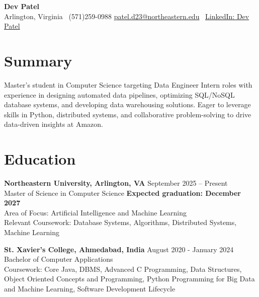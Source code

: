 \documentclass[a4paper,10pt]{article}
\begin{document}
\begin{center}
\vspace{-3mm}
    \fontsize{16}{18}\selectfont \textbf{Dev Patel} \\
    \vspace{0mm}
    \normalsize Arlington, Virginia \textbar\ (571)259-0988  \textbar       \href{mailto:patel.d23@northeastern.edu}{patel.d23@northeastern.edu} \textbar\ \href{https://www.linkedin.com/in/devxpatel//}{LinkedIn: Dev Patel} \\
\end{center}



\section*{Summary}
Master's student in Computer Science targeting Data Engineer Intern roles with experience in designing automated data pipelines, optimizing SQL/NoSQL database systems, and developing data warehousing solutions. Eager to leverage skills in Python, distributed systems, and collaborative problem-solving to drive data-driven insights at Amazon.
 
\vspace{ 0 mm}
\section*{Education}
\textbf{Northeastern University, Arlington, VA} \hfill September 2025 -- Present\\
Master of Science in Computer Science \hfill \textbf{Expected graduation: December 2027} \\
Area of Focus: Artificial Intelligence and Machine Learning\\
Relevant Coursework: Database Systems, Algorithms, Distributed Systems, Machine Learning

\vspace{1 mm} %
\textbf{St. Xavier's College, Ahmedabad, India} \hfill August 2020 - January 2024 \\
Bachelor of Computer Applications\\
Coursework: Core Java, DBMS, Advanced C Programming, Data Structures, Object Oriented Concepts and Programming, Python Programming for Big Data and Machine Learning, Software Development Lifecycle
\end{document}
